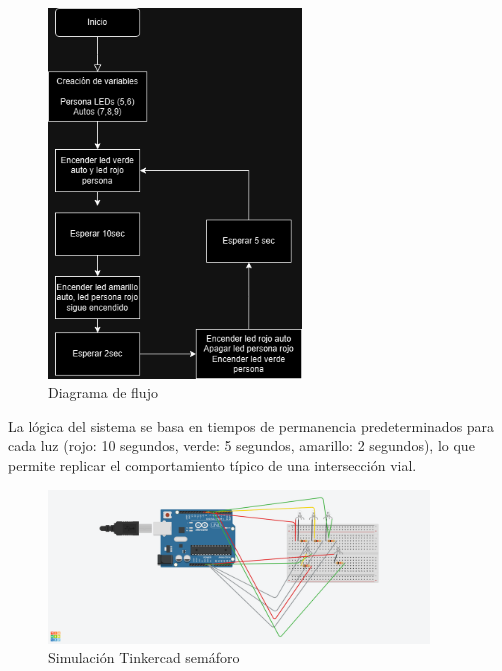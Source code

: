 \documentclass{article}
\begin{document}
\begin{figure}[H]
    \centering
    \includegraphics[width=0.6\textwidth]{./img/flujo_semaforo.png}
    \caption{Diagrama de flujo}
    \label{fig:flujo_semaforo}
\end{figure}

La lógica del sistema se basa en tiempos de permanencia predeterminados para cada luz (rojo: 10 segundos, verde: 5 segundos, amarillo: 2 segundos), lo que permite replicar el comportamiento típico de una intersección vial.

\begin{figure}[H]
    \centering
    \includegraphics[width=0.9\textwidth]{./img/simulacion_semaforo.png}
    \caption{Simulación Tinkercad semáforo}
    \label{fig:simulacion_semaforo}
\end{figure}
\end{document}
